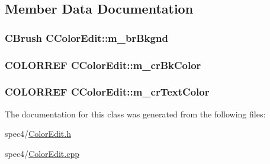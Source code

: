 \subsection{Member Data Documentation}
\hypertarget{classCColorEdit_a2b05402a285e0d62a6a4d289cca51bbe}{
\subsubsection[{m\_\-brBkgnd}]{\setlength{\rightskip}{0pt plus 5cm}CBrush {\bf CColorEdit::m\_\-brBkgnd}}}
\label{classCColorEdit_a2b05402a285e0d62a6a4d289cca51bbe}
\hypertarget{classCColorEdit_a11eceaa262ad227cdcb2bf8af03e0326}{
\subsubsection[{m\_\-crBkColor}]{\setlength{\rightskip}{0pt plus 5cm}COLORREF {\bf CColorEdit::m\_\-crBkColor}}}
\label{classCColorEdit_a11eceaa262ad227cdcb2bf8af03e0326}
\hypertarget{classCColorEdit_acaeca1db8546c61a45b3d7dace1ec57a}{
\subsubsection[{m\_\-crTextColor}]{\setlength{\rightskip}{0pt plus 5cm}COLORREF {\bf CColorEdit::m\_\-crTextColor}}}
\label{classCColorEdit_acaeca1db8546c61a45b3d7dace1ec57a}


The documentation for this class was generated from the following files:\begin{DoxyCompactItemize}
\item 
spec4/\hyperlink{ColorEdit_8h}{ColorEdit.h}\item 
spec4/\hyperlink{ColorEdit_8cpp}{ColorEdit.cpp}\end{DoxyCompactItemize}
